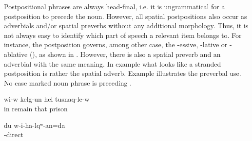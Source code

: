 Postpositional phrases are always head-final, i.e. it is ungrammatical for a postposition to precede the noun. However, all spatial postpositions also occur as adverbials and/or spatial preverbs without any additional morphology. Thus, it is not always easy to identify which part of speech a relevant item belongs to. For instance, the postposition   governs, among other case, the -essive, -lative or -ablative (), as shown in . However, there is also a spatial preverb  and an adverbial  with the same meaning. In example  what looks like a stranded postposition  is rather the spatial adverb. Example  illustrates the preverbal use. No case marked noun phrase is preceding .
%
\begin{exe}
	\ex	\label{ex:He stayed in prison}
	\gll	wi-w kelg-un	hel	tusnaq-le-w\\
		in remain	that	prison\\
	\glt	{}

	\ex	\label{ex:I will go inside}
	\gll	du	w-i-ha-lqʷ-an=da\\
			-direct\\
	\glt	{}
\end{exe}
